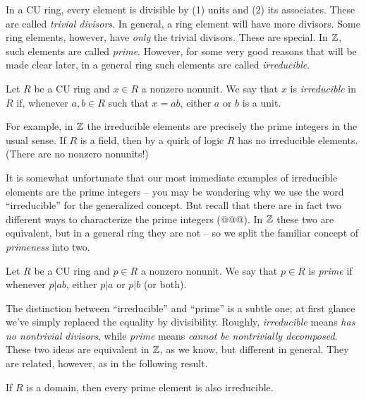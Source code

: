 In a CU ring, every element is divisible by (1) units and (2) its associates. These are called \emph{trivial divisors}. In general, a ring element will have more divisors. Some ring elements, however, have \emph{only} the trivial divisors. These are special. In \(\mathbb{Z}\), such elements are called \emph{prime}. However, for some very good reasons that will be made clear later, in a general ring such elements are called \emph{irreducible}.

\begin{dfn}[Irreducible] \label{dfn:irreducible-element}
Let \(R\) be a CU ring and \(x \in R\) a nonzero nonunit. We say that \(x\) is \emph{irreducible}  in \(R\) if, whenever \(a,b \in R\) such that \(x = ab\), either \(a\) or \(b\) is a unit.
\end{dfn}

For example, in \(\mathbb{Z}\) the irreducible elements are precisely the prime integers in the usual sense. If \(R\) is a field, then by a quirk of logic \(R\) has no irreducible elements. (There are no nonzero nonunits!)

It is somewhat unfortunate that our most immediate examples of irreducible elements are the prime integers -- you may be wondering why we use the word ``irreducible'' for the generalized concept. But recall that there are in fact two different ways to characterize the prime integers (@@@). In \(\mathbb{Z}\) these two are equivalent, but in a general ring they are not -- so we split the familiar concept of \emph{primeness} into two.

\begin{dfn}[Prime] \label{dfn:prime-element}
Let \(R\) be a CU ring and \(p \in R\) a nonzero nonunit. We say that \(p \in R\) is \emph{prime}  if whenever \(p|ab\), either \(p|a\) or \(p|b\) (or both).
\end{dfn}

The distinction between ``irreducible'' and ``prime'' is a subtle one; at first glance we've simply replaced the equality by divisibility. Roughly, \emph{irreducible} means \emph{has no nontrivial divisors}, while \emph{prime} means \emph{cannot be nontrivially decomposed}. These two ideas are equivalent in \(\mathbb{Z}\), as we know, but different in general. They are related, however, as in the following result.

\begin{prop}
If \(R\) is a domain, then every prime element is also irreducible.
\end{prop}

